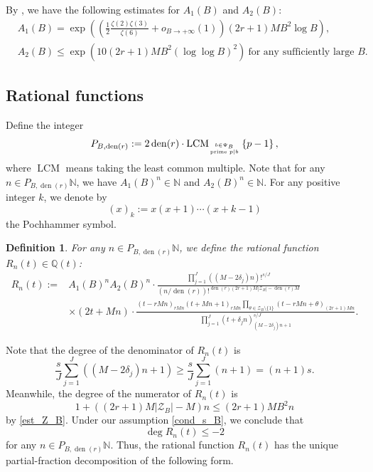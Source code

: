 \documentclass[12pt]{article}
\newtheorem{definition}[theorem]{Definition}
\numberwithin{equation}{section}
\begin{document}
By \cite[Lem. 2.4]{LY2020}, we have the following estimates for $A_1(B)$ and $A_2(B)$:
\begin{align}
	& A_1(B)=\exp \left(\left(\frac{1}{2} \frac{\zeta(2) \zeta(3)}{\zeta(6)}+o_{B \rightarrow+\infty}(1)\right)(2r+1)M B^2 \log B\right), \label{est_A_1}\\
	& A_2(B) \leqslant \exp \left(10(2 r+1)M B^2(\log \log B)^2\right) ~\text{for any sufficiently large~} B. \label{est_A_2}
\end{align}

\subsection{Rational functions}

Define the integer 
\begin{equation*}
	P_{B,\operatorname{den}(r)} := 2\operatorname{den}(r) \cdot \operatorname{LCM}_{b \in \Psi_B \atop \text{prime~} p \mid b} \left\{ p-1 \right\}, 
\end{equation*}
where $\operatorname{LCM}$ means taking the least common multiple. Note that for any $n \in P_{B,\operatorname{den}(r)}\mathbb{N}$, we have $A_1(B)^n \in \mathbb{N}$ and $A_2(B)^n \in \mathbb{N}$. For any positive integer $k$, we denote by 
\[ (x)_k := x(x+1)\cdots(x+k-1) \]
the Pochhammer symbol.

\begin{definition}\label{def_R_n}
For any $n \in P_{B,\operatorname{den}(r)}\mathbb{N}$, we define the rational function $R_n(t) \in \mathbb{Q}(t)$:
\begin{align*}
	R_n(t) :=  &A_1(B)^n A_2(B)^n \cdot \frac{\prod_{j=1}^{J} \left( (M-2\delta_j)n \right)!^{s/J} }{\left( n/\operatorname{den}(r) \right)!^{\operatorname{den}(r)(2r+1)M|\mathcal{Z}_B| - \operatorname{den}(r)M }} \\
	&\times (2t+Mn) \cdot \frac{(t-rMn)_{rMn} (t+Mn+1)_{rMn} \prod_{\theta \in \mathcal{Z}_B \setminus \{ 1 \}} (t-rMn+\theta)_{(2r+1)Mn} }{\prod_{j=1}^{J} (t+\delta_j n)_{(M-2\delta_j)n + 1}^{s/J} }.
\end{align*}
\end{definition}

\medskip

Note that the degree of the denominator of $R_n(t)$ is 
\[ \frac{s}{J} \sum_{j=1}^{J} \left( (M-2\delta_j)n + 1\right) \geqslant \frac{s}{J} \sum_{j=1}^{J} (n+1) = (n+1)s.  \]
Meanwhile, the degree of the numerator of $R_n(t)$ is 
\[ 1 + ((2r+1)M|\mathcal{Z}_B| - M)n \leqslant (2r+1)M B^2 n \]
by \eqref{est_Z_B}. Under our assumption \eqref{cond_s_B}, we conclude that
\[  \deg R_n(t) \leqslant -2 \]
for any $n \in P_{B,\operatorname{den}(r)}\mathbb{N}$. Thus, the rational function $R_n(t)$ has the unique partial-fraction decomposition of the following form.
\end{document}

